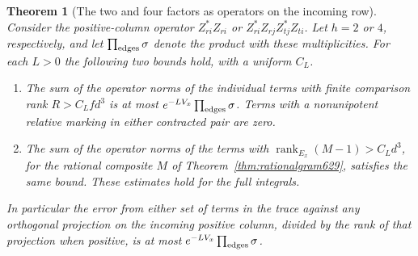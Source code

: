 \documentclass[a4paper,11pt]{article}
\newtheorem{theorem}[proposition]{Theorem}
\theoremstyle{definition}
\theoremstyle{remark}
\numberwithin{equation}{section}
\begin{document}
\begin{theorem}[The two and four factors as operators on the incoming row]
\leavevmode\label{thm:rankoperator630}
Consider the positive-column operator \(Z_{ri}^*Z_{ri}\) or
\(Z_{ri}^*Z_{rj}Z_{tj}^*Z_{ti}\). Let \(h=2\) or \(4\), respectively,
and let \(\prod_{\rm edges}\sigma\) denote the product with these
multiplicities. For each \(L>0\) the following two bounds hold,
with a uniform \(C_L\).
\begin{enumerate}
\item The sum of the operator norms of the individual terms with
finite comparison rank \(R>C_L f d^3\) is at most
\(e^{-L V_x}\prod_{\rm edges}\sigma\). Terms with a nonunipotent
relative marking in either contracted pair are zero.
\item The sum of the operator norms of the terms with
\(\operatorname{rank}_{E_x}(M-1)>C_Ld^3\), for the rational
composite \(M\) of Theorem~\ref{thm:rationalgram629}, satisfies
the same bound. These estimates hold for the full integrals.
\end{enumerate}
In particular the error from either set of terms in the trace
against any orthogonal projection on the incoming positive column,
divided by the rank of that projection when positive, is at most
\(e^{-LV_x}\prod_{\rm edges}\sigma\).
\end{theorem}
\end{document}

